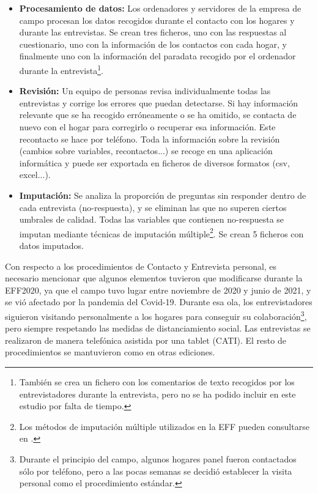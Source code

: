 \begin{itemize}
    \item \textbf{Procesamiento de datos:} Los ordenadores y servidores de la empresa de campo procesan los datos recogidos durante el contacto con los hogares y durante las entrevistas. Se crean tres ficheros, uno con las respuestas al cuestionario, uno con la información de los contactos con cada hogar, y finalmente uno con la información del paradata recogido por el ordenador durante la entrevista\footnote{También se crea un fichero con los comentarios de texto recogidos por los entrevistadores durante la entrevista, pero no se ha podido incluir en este estudio por falta de tiempo.}.
    \item \textbf{Revisión:} Un equipo de personas revisa individualmente todas las entrevistas y corrige los errores que puedan detectarse. Si hay información relevante que se ha recogido erróneamente o se ha omitido, se contacta de nuevo con el hogar para corregirlo o recuperar esa información. Este recontacto se hace por teléfono. Toda la información sobre la revisión (cambios sobre variables, recontactos...) se recoge en una aplicación informática y puede ser exportada en ficheros de diversos formatos (csv, excel...).
    \item \textbf{Imputación:} Se analiza la proporción de preguntas sin responder dentro de cada entrevista (no-respuesta), y se eliminan las que no superen ciertos umbrales de calidad. Todas las variables que contienen no-respuesta se imputan mediante técnicas de imputación múltiple\footnote{Los métodos de imputación múltiple utilizados en la EFF pueden consultarse en \cite{barcelo2006imputation}.}. Se crean 5 ficheros con datos imputados.
\end{itemize}

Con respecto a los procedimientos de Contacto y Entrevista personal, es necesario mencionar que algunos elementos tuvieron que modificarse durante la EFF2020, ya que el campo tuvo lugar entre noviembre de 2020 y junio de 2021, y se vió afectado por la pandemia del Covid-19. Durante esa ola, los entrevistadores siguieron visitando personalmente a los hogares para conseguir su colaboración\footnote{Durante el principio del campo, algunos hogares panel fueron contactados sólo por teléfono, pero a las pocas semanas se decidió establecer la visita personal como el procedimiento estándar.}, pero siempre respetando las medidas de distanciamiento social. Las entrevistas se realizaron de manera telefónica asistida por una tablet (CATI). El resto de procedimientos se mantuvieron como en otras ediciones.

